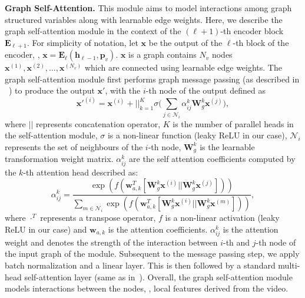 \documentclass[10pt,twocolumn,letterpaper]{article}
\begin{document}
\vspace{0.05in}
\noindent
\textbf{Graph Self-Attention.} This module aims to model interactions among graph structured variables along with learnable edge weights. Here, we describe the graph self-attention module in the context of the $(\ell+1)$-th encoder block $\mathbf{E}_{\ell+1}$. For simplicity of notation, let $\mathbf{x}$ be the output of the $\ell$-th block of the encoder, \ie, $\mathbf{x} = \mathbf{E}_{\ell}(\mathbf{h}_{\ell-1},\mathbf{p}_{v})$. $\mathbf{x}$ is a graph contains $N_v$ nodes $\mathbf{x}^{(1)}, \mathbf{x}^{(2)}, \ldots, \mathbf{x}^{(N_v)}$ which are connected using learnable edge weights. The graph self-attention module first performs graph message passing (as described in ~\cite{velivckovic2017graph}) to produce the output $\mathbf{x}'$, with the $i$-th node of the output defined as
\begin{equation}
    \mathbf{x'}^{(i)} = \mathbf{x}^{(i)} + \Big| \Big|_{k=1} ^{K} \sigma \Big(\sum_{j \in \mathcal{N}_i} \alpha_{ij}^{k} \mathbf{W}_{g}^{k} \mathbf{x}^{(j)}\Big),
\end{equation}
where $\Big| \Big|$ represents concatenation operator, $K$ is the number of parallel heads in the self-attention module, $\sigma$ is a non-linear function (leaky ReLU in our case), $\mathcal{N}_i$ represents the set of neighbours of the $i$-th node, $\mathbf{W}_{g}^{k}$ is the learnable transformation weight matrix. $\alpha_{ij}^{k}$ are the self attention coefficients computed by the $k$-th attention head described as:
\begin{equation} \label{eq:graph_sa}
\alpha_{ij}^{k} = \frac{\exp (f(\mathbf{w}_{a,k}^{T} [\mathbf{W}_{g}^{k}\mathbf{x}^{(i)} || \mathbf{W}_{g}^{k}\mathbf{x}^{(j)}]))}{\sum_{m \in \mathcal{N}_i}\exp (f(\mathbf{w}_{a,k}^{T} [\mathbf{W}_{g}^{k}\mathbf{x}^{(i)} || \mathbf{W}_{g}^{k}\mathbf{x}^{(m)}]))},    
\end{equation}
where $\cdot^{T}$ represents a transpose operator, $f$ is a non-linear activation (leaky ReLU in our case) and $\mathbf{w}_{a,k}$ is the attention coefficients. $\alpha_{ij}^{k}$ is the attention weight and denotes the strength of the interaction between $i$-th and $j$-th node of the input graph of the module.
Subsequent to the message passing step, we apply batch normalization and a linear layer. This is then followed by a standard multi-head self-attention layer (same as in~\cite{vaswani2017attention}). 
Overall, the graph self-attention module models interactions between the nodes, \ie, local features derived from the video. 
\end{document}
